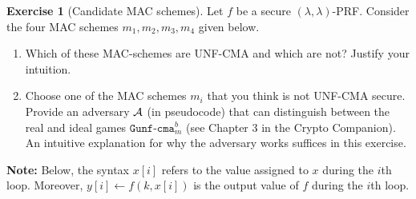 \documentclass[envcountsame,runningheads,notitlepage]{../llncs}
\theoremstyle{definition}
\newtheorem{graded}[crossed]{Exercise}
\newcommand{\V}[1]{\ensuremath{\mathit{#1}}}
\newcommand{\StyleModel}[1]{\V{{#1}}}
\newcommand{\m}{\StyleModel{m}}
\begin{document}
\begin{graded}[Candidate MAC schemes]
Let $f$ be a secure $(\lambda,\lambda)$-PRF. Consider the four MAC schemes $\m_1,\m_2,\m_3,\m_4$ given below.
\begin{enumerate}
\item Which of these MAC-schemes are UNF-CMA and which are not? Justify your intuition.
\item Choose one of the MAC schemes $\m_i$ that you think is not UNF-CMA secure. Provide an adversary $\mathcal{A}$ (in pseudocode) that can distinguish between the real and ideal games  $\texttt{Gunf-cma}_m^b$ (see Chapter 3 in the Crypto Companion). An intuitive explanation for why the adversary works suffices in this exercise.
\end{enumerate}

\noindent
\textbf{Note:} Below, the syntax $x[i]$ refers to the value assigned to $x$ during the $i$th loop. Moreover, $y[i]\leftarrow f(k,x[i])$ is the output value of $f$ during the $i$th loop.


\end{graded}
\end{document}
